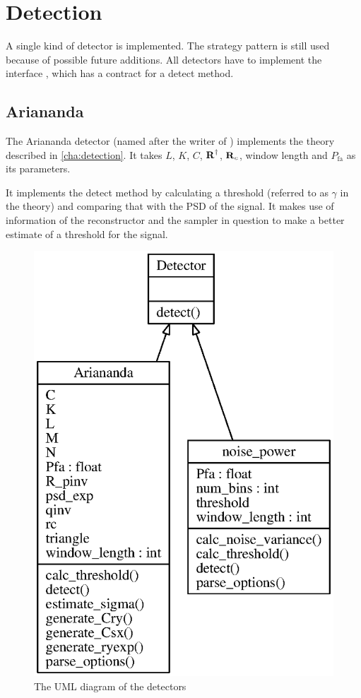 \documentclass[a4paper, openany, oneside]{memoir}
\begin{document}
\section{Detection}
\label{sec:detection}
A single kind of detector is implemented. The strategy pattern is still used because of possible future additions. All detectors have to implement the interface , which has a contract for a detect method.

\subsection{Ariananda}
\label{sub:ariananda}
The Ariananda detector (named after the writer of \cite{ariananda2012compressive}) implements the theory described in \cref{cha:detection}. It takes $L$, $K$, $C$, $\boldsymbol{\mathbf{R}}^\dagger$, $\boldsymbol{\mathbf{R}}_c$, window length and $P_{\text{fa}}$ as its parameters.

It implements the detect method by calculating a threshold (referred to as $\gamma$ in the theory) and comparing that with the PSD of the signal. It makes use of information of the reconstructor and the sampler in question to make a better estimate of a threshold for the signal.


\begin{figure}
    \centering
    \includegraphics[width=0.5\linewidth]{./figures/classes_detection.eps}
    \caption{The UML diagram of the detectors}
    \label{fig:umldetector}
\end{figure}
\end{document}
